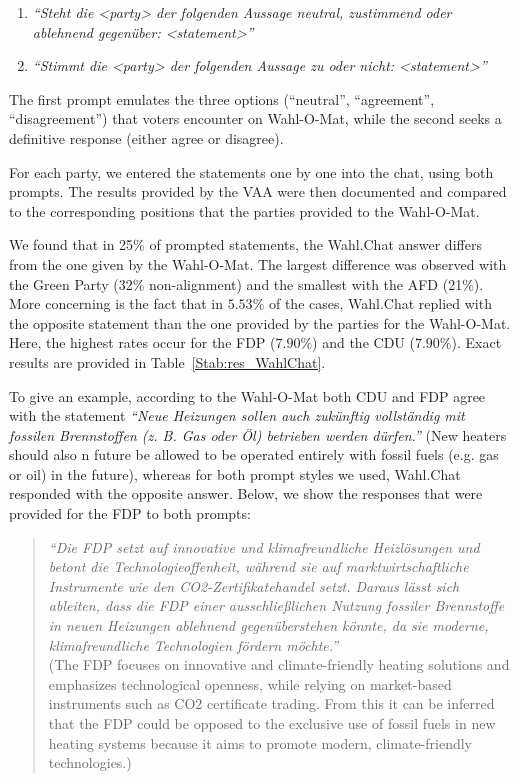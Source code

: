 \documentclass[
	fontsize=10pt,          %
	numbers=noenddot,    	%
    parskip=half,        	%
    listof=totoc,        	%
    bibliography=totoc,  	%
	headsepline=true,       %
	footsepline=false, 		%
    DIV=12                	%
]{scrartcl}
\begin{document}
\begin{enumerate}
    \item \small \emph{``Steht die <party> der folgenden Aussage neutral, zustimmend oder ablehnend gegenüber: <statement>''}
    \item \small \emph{``Stimmt die <party> der folgenden Aussage zu oder nicht: <statement>''}
\end{enumerate}

The first prompt emulates the three options (``neutral'', ``agreement'', ``disagreement'') that voters encounter on Wahl-O-Mat, while the second seeks a definitive response (either agree or disagree).

For each party, we entered the statements one by one into the chat, using both prompts. The results provided by the VAA were then documented and compared to the corresponding positions that the parties provided to the Wahl-O-Mat.

We found that in 25\% of prompted statements, the Wahl.Chat answer differs from the one given by the Wahl-O-Mat. The largest difference was observed with the Green Party (32\% non-alignment) and the smallest with the AFD (21\%). More concerning is the fact that in $5.53\%$ of the cases, Wahl.Chat replied with the opposite statement than the one provided by the parties for the Wahl-O-Mat. Here, the highest rates occur for the FDP ($7.90 \%$) and the CDU ($7.90\%$). Exact results are provided in Table~\ref{Stab:res_WahlChat}.

To give an example, according to the Wahl-O-Mat both CDU and FDP agree with the statement \emph{``Neue Heizungen sollen auch zukünftig vollständig mit fossilen Brennstoffen (z. B. Gas oder Öl) betrieben werden dürfen.''} (New heaters should also n future be allowed to be operated entirely with fossil fuels (e.g. gas or oil) in the future), whereas for both prompt styles we used, Wahl.Chat responded with the opposite answer. Below, we show the responses that were provided for the FDP to both prompts:


\begin{quote}
 \small \emph{``Die FDP setzt auf innovative und klimafreundliche Heizl\"osungen und betont die Technologieoffenheit, w\"ahrend sie auf marktwirtschaftliche Instrumente wie den CO2-Zertifikatehandel setzt. Daraus l\"asst sich ableiten, dass die FDP einer ausschließlichen Nutzung fossiler Brennstoffe in neuen Heizungen ablehnend gegen\"uberstehen könnte, da sie moderne, klimafreundliche Technologien f\"ordern m\"ochte.''}\\(The FDP focuses on innovative and climate-friendly heating solutions and emphasizes technological openness, while relying on market-based instruments such as CO2 certificate trading. From this it can be inferred that the FDP could be opposed to the exclusive use of fossil fuels in new heating systems because it aims to promote modern, climate-friendly technologies.)
\end{quote}
\end{document}
